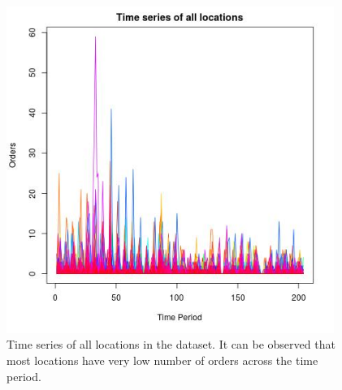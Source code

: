 \documentclass[12pt, letterpaper] {article}
\begin{document}
\begin{figure}[H]
    \centering
    \includegraphics[width=0.95\textwidth, height=0.7\textheight]{Images/example_all_ts.jpg}
    \caption{Time series of all locations in the dataset. It can be observed that most locations have very low number of orders across the time period.}
    \label{fig:Time series of all locations in the dataset. It can be observed that most locations have very low number of orders across the time period.}
\end{figure}
\end{document}
